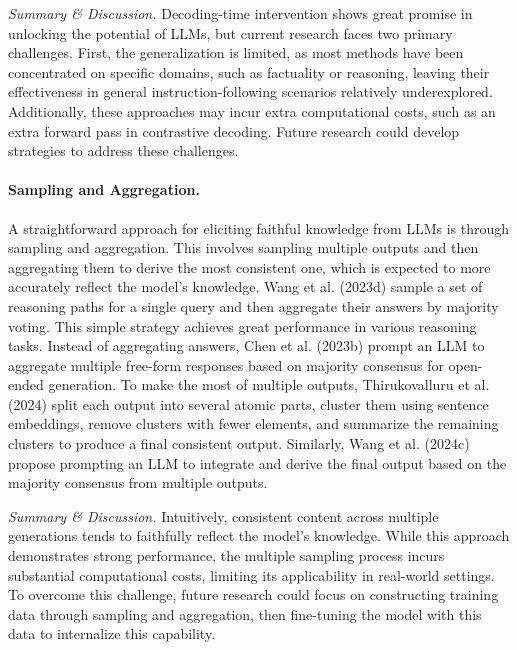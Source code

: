 \emph{Summary \& Discussion.} Decoding-time intervention shows great promise in unlocking the potential of LLMs, but current research faces two primary challenges. First, the generalization is limited, as most methods have been concentrated on specific domains, such as factuality or reasoning, leaving their effectiveness in general instruction-following scenarios relatively underexplored. Additionally, these approaches may incur extra computational costs, such as an extra forward pass in contrastive decoding. Future research could develop strategies to address these challenges.

\paragraph{Sampling and Aggregation.} A straightforward approach for eliciting faithful knowledge from LLMs is through sampling and aggregation. This involves sampling multiple outputs and then aggregating them to derive the most consistent one, which is expected to more accurately reflect the model's knowledge. Wang et al. (2023d) sample a set of reasoning paths for a single query and then aggregate their answers by majority voting. This simple strategy achieves great performance in various reasoning tasks. Instead of aggregating answers, Chen et al. (2023b) prompt an LLM to aggregate multiple free-form responses based on majority consensus for open-ended generation. To make the most of multiple outputs, Thirukovalluru et al. (2024) split each output into several atomic parts, cluster them using sentence embeddings, remove clusters with fewer elements, and summarize the remaining clusters to produce a final consistent output. Similarly, Wang et al. (2024c) propose prompting an LLM to integrate and derive the final output based on the majority consensus from multiple outputs.

\emph{Summary \& Discussion.} Intuitively, consistent content across multiple generations tends to faithfully reflect the model's knowledge. While this approach demonstrates strong performance, the multiple sampling process incurs substantial computational costs, limiting its applicability in real-world settings. To overcome this challenge, future research could focus on constructing training data through sampling and aggregation, then fine-tuning the model with this data to internalize this capability.

